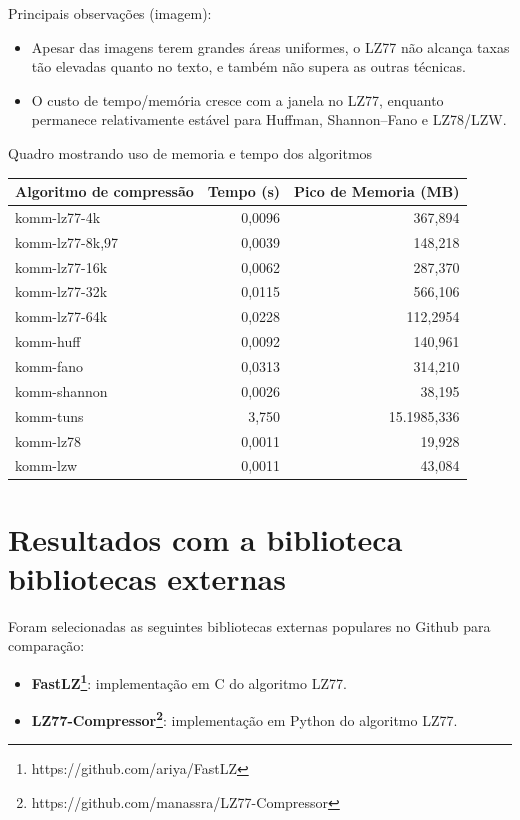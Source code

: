 Principais observações (imagem):
\begin{itemize}
  \item Apesar das imagens terem grandes áreas uniformes, o LZ77 não alcança taxas tão elevadas quanto no texto, e também não supera as outras técnicas.
  \item O custo de tempo/memória cresce com a janela no LZ77, enquanto permanece relativamente estável para Huffman, Shannon--Fano e LZ78/LZW.
\end{itemize}

\begin{quadro}[ht]
\caption{Quadro mostrando uso de memoria e tempo dos algoritmos}\label{quadro:resultados-komm-smiley}
\begin{tabular}{|l|r|r|}
    \hline
    \textbf{Algoritmo de compressão}& \textbf{Tempo (s)}  & \textbf{Pico de Memoria (MB)} \\ \hline
    komm-lz77-4k & 0,0096 & 367,894 \\ \hline
    komm-lz77-8k,97 & 0,0039 & 148,218 \\ \hline
    komm-lz77-16k & 0,0062 & 287,370 \\ \hline
    komm-lz77-32k & 0,0115 & 566,106 \\ \hline
    komm-lz77-64k & 0,0228 & 112,2954 \\ \hline
    komm-huff & 0,0092 & 140,961 \\ \hline
    komm-fano & 0,0313 & 314,210 \\ \hline
    komm-shannon & 0,0026 & 38,195 \\ \hline
    komm-tuns & 3,750 & 15.1985,336 \\ \hline
    komm-lz78 & 0,0011 & 19,928 \\ \hline
    komm-lzw & 0,0011 & 43,084 \\ \hline

\end{tabular}
\fonteproprioautor
\end{quadro}

\newpage

\section{Resultados com a biblioteca bibliotecas externas}
Foram selecionadas as seguintes bibliotecas externas populares no Github para comparação:
\begin{itemize}
  \item \textbf{FastLZ\footnote{https://github.com/ariya/FastLZ}}: implementação em C do algoritmo LZ77.
  \item \textbf{LZ77-Compressor\footnote{https://github.com/manassra/LZ77-Compressor}}: implementação em Python do algoritmo LZ77.
\end{itemize}

